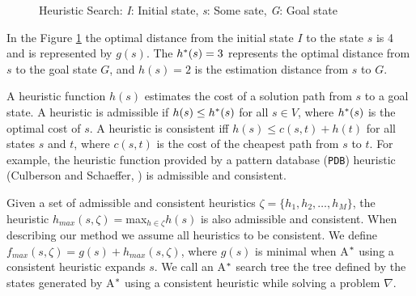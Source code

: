\begin{figure}[htb]
\centering
{}
\caption{Heuristic Search: \textit{I}: Initial state, \textit{s}: Some sate, \textit{G}: Goal state} \label{fig:searchSpace}
\end{figure}

In the Figure \ref{fig:searchSpace} the optimal distance from the initial state $I$ to  the state $s$ is 4 and is represented by $g(s)$. The $h\sp{*}(s) = 3$ represents the optimal distance from $s$ to the goal state $G$, and $h(s) = 2$ is the estimation distance from $s$ to $G$.

A heuristic function $h(s)$ estimates the cost of a solution path from $s$ to a goal state. A heuristic is admissible if $h(s) \leq h\sp{*}(s)$ for all $s \in V$, where $h\sp{*}(s)$ is the optimal cost of $s$. A heuristic is consistent iff $h(s) \leq c(s,t) + h(t)$ for all states $s$ and $t$, where $c(s,t)$ is the cost of the cheapest path from $s$ to $t$. For example, the heuristic function provided by a pattern database (\texttt{PDB}) heuristic (Culberson and Schaeffer, \citeyear{culberson1998pattern}) is admissible and consistent.

Given a set of admissible and consistent heuristics $\zeta = \{h_{1}, h_{2}, \dots, h_{M}\}$, the heuristic $h_{max}(s,\zeta) = $max$_{h \in \zeta} h(s)$ is also admissible and consistent. When describing our method we assume all heuristics to be consistent. We define $f_{max}(s, \zeta) = g(s) + h_{max}(s, \zeta)$, where $g(s)$ is minimal when A$\sp{*}$ using a consistent heuristic expands $s$. We call an A$\sp{*}$ search tree the tree defined by the states generated by A$\sp{*}$ using a consistent heuristic while solving a problem $\nabla$.

